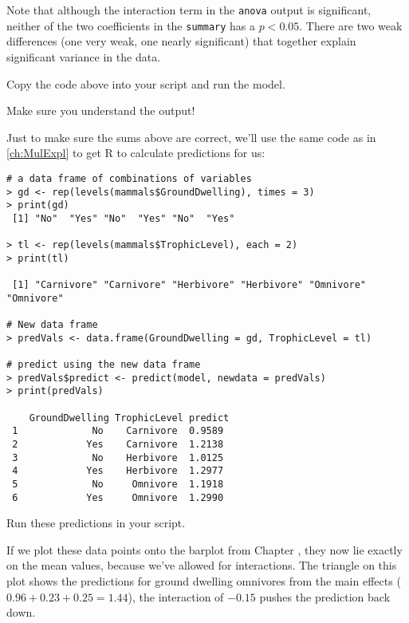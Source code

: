 Note that although the interaction term in the {\tt anova} output is 
significant, neither of the two coefficients in the {\tt summary} has a 
$p<0.05$. There are two weak differences (one very weak, one nearly 
significant) that together explain significant variance in the data.

\begin{compactitem}[$\quad\star$]
	\item Copy the code above into your script and run the model.
	\item Make sure you understand the output!
\end{compactitem}

Just to make sure the sums above are correct, we'll use the same code 
as in \ref{ch:MulExpl} to get R to calculate predictions for us: 

\begin{lstlisting}
# a data frame of combinations of variables
> gd <- rep(levels(mammals$GroundDwelling), times = 3)
> print(gd)
 [1] "No"  "Yes" "No"  "Yes" "No"  "Yes"

> tl <- rep(levels(mammals$TrophicLevel), each = 2)
> print(tl)

 [1] "Carnivore" "Carnivore" "Herbivore" "Herbivore" "Omnivore"  "Omnivore" 

# New data frame
> predVals <- data.frame(GroundDwelling = gd, TrophicLevel = tl)

# predict using the new data frame
> predVals$predict <- predict(model, newdata = predVals)
> print(predVals)
 
    GroundDwelling TrophicLevel predict
 1             No    Carnivore  0.9589
 2            Yes    Carnivore  1.2138
 3             No    Herbivore  1.0125
 4            Yes    Herbivore  1.2977
 5             No     Omnivore  1.1918
 6            Yes     Omnivore  1.2990
\end{lstlisting}

\begin{compactitem}[$\quad\star$]
	\item Run these predictions in your script.
\end{compactitem}

If we plot these data points onto the barplot from Chapter 
\label{ch:MulExpl}, they now lie exactly on the mean values, 
because we've allowed for interactions. The triangle on this plot shows 
the predictions for ground dwelling omnivores from the main effects 
($0.96 + 0.23  + 0.25 = 1.44$), the interaction of $-0.15$ pushes the 
prediction back down.

